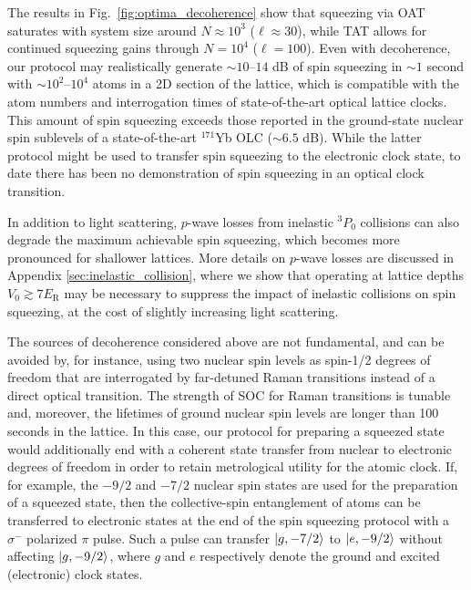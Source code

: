 \documentclass[aps,prx,superscriptaddress,notitlepage,twocolumn,longbibliography]{revtex4-2}
\renewcommand{\t}{\text} %
\renewcommand{\ket}{\Ket}
\begin{document}
The results in Fig.~\ref{fig:optima_decoherence} show that squeezing via OAT saturates with system size around $N\approx10^3$ ($\ell\approx30$), while TAT allows for continued squeezing gains through $N=10^4$ ($\ell=100$).
Even with decoherence, our protocol may realistically generate $\sim10$--$14$ dB of spin squeezing in $\sim1$ second with $\sim10^2$--$10^4$ atoms in a 2D section of the lattice, which is compatible with the atom numbers and interrogation times of state-of-the-art optical lattice clocks\cite{campbell2017fermidegenerate, marti2018imaging}.
This amount of spin squeezing exceeds those reported in the ground-state nuclear spin sublevels of a state-of-the-art ${}^{171}$Yb OLC ($\sim6.5$ dB)\cite{braverman2019nearunitary}.
While the latter protocol might be used to transfer spin squeezing to the electronic clock state, to date there has been no demonstration of spin squeezing in an optical clock transition.

In addition to light scattering, $p$-wave losses from inelastic ${}^3 P_0$ collisions\cite{martin2013quantum, zhang2014spectroscopic, bishof2011inelastic} can also degrade the maximum achievable spin squeezing, which becomes more pronounced for shallower lattices.
More details on $p$-wave losses are discussed in Appendix \ref{sec:inelastic_collision}, where we show that operating at lattice depths $V_0\gtrsim 7 E_{\t{R}}$ may be necessary to suppress the impact of inelastic collisions on spin squeezing, at the cost of slightly increasing light scattering.

The sources of decoherence considered above are not fundamental, and can be avoided by, for instance, using two nuclear spin levels as spin-1/2 degrees of freedom that are interrogated by far-detuned Raman transitions instead of a direct optical transition\cite{mancini2015observation}.
The strength of SOC for Raman transitions is tunable and, moreover, the lifetimes of ground nuclear spin levels are longer than 100 seconds in the lattice\cite{goban2018emergence}.
In this case, our protocol for preparing a squeezed state would additionally end with a coherent state transfer from nuclear to electronic degrees of freedom in order to retain metrological utility for the atomic clock.
If, for example, the $-9/2$ and $-7/2$ nuclear spin states are used for the preparation of a squeezed state, then the collective-spin entanglement of atoms can be transferred to electronic states at the end of the spin squeezing protocol with a $\sigma^-$ polarized $\pi$ pulse.
Such a pulse can transfer $\ket{g,-7/2}$ to $\ket{e,-9/2}$ without affecting $\ket{g,-9/2}$, where $g$ and $e$ respectively denote the ground and excited (electronic) clock states.
\end{document}
